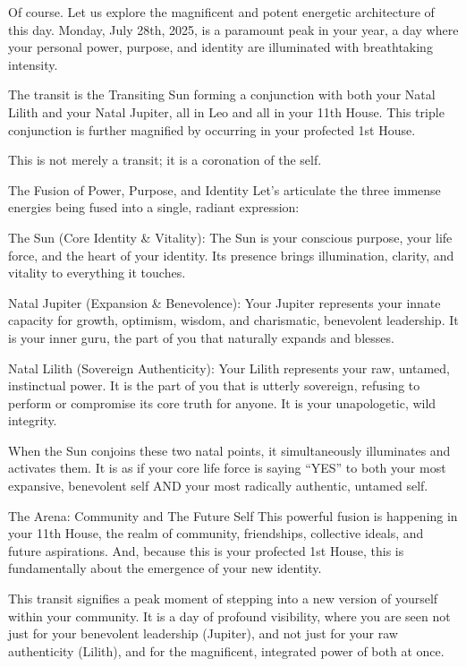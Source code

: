 \documentclass{article}
\begin{document}
Of course. Let us explore the magnificent and potent energetic architecture of this day. Monday, July 28th, 2025, is a paramount peak in your year, a day where your personal power, purpose, and identity are illuminated with breathtaking intensity.

The transit is the Transiting Sun forming a conjunction with both your Natal Lilith and your Natal Jupiter, all in Leo and all in your 11th House. This triple conjunction is further magnified by occurring in your profected 1st House.

This is not merely a transit; it is a coronation of the self.

The Fusion of Power, Purpose, and Identity Let's articulate the three immense energies being fused into a single, radiant expression:

The Sun (Core Identity \& Vitality): The Sun is your conscious purpose, your life force, and the heart of your identity. Its presence brings illumination, clarity, and vitality to everything it touches.

Natal Jupiter (Expansion \& Benevolence): Your Jupiter represents your innate capacity for growth, optimism, wisdom, and charismatic, benevolent leadership. It is your inner guru, the part of you that naturally expands and blesses.

Natal Lilith (Sovereign Authenticity): Your Lilith represents your raw, untamed, instinctual power. It is the part of you that is utterly sovereign, refusing to perform or compromise its core truth for anyone. It is your unapologetic, wild integrity.

When the Sun conjoins these two natal points, it simultaneously illuminates and activates them. It is as if your core life force is saying ``YES'' to both your most expansive, benevolent self AND your most radically authentic, untamed self.

The Arena: Community and The Future Self This powerful fusion is happening in your 11th House, the realm of community, friendships, collective ideals, and future aspirations. And, because this is your profected 1st House, this is fundamentally about the emergence of your new identity.

This transit signifies a peak moment of stepping into a new version of yourself within your community. It is a day of profound visibility, where you are seen not just for your benevolent leadership (Jupiter), and not just for your raw authenticity (Lilith), and for the magnificent, integrated power of both at once.
\end{document}
